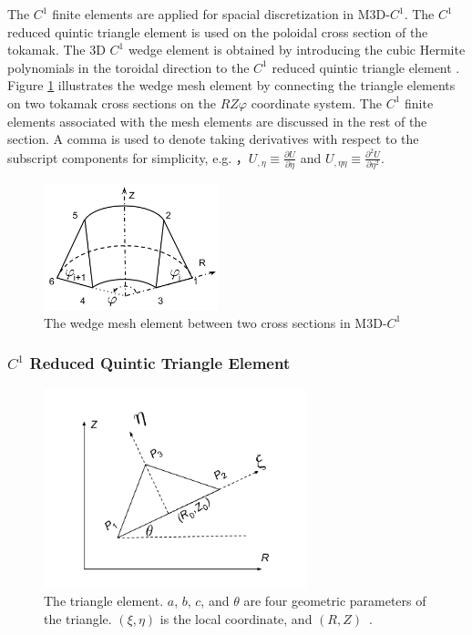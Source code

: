 \documentclass[11pt]{article}  %
\begin{document}
The $C^1$ finite elements are applied for spacial discretization in M3D-$C^1$. The $C^1$ reduced quintic triangle element \cite{jardin2004triangular} is used on the poloidal cross section of  the tokamak. The 3D $C^1$ wedge element is obtained by  introducing  the cubic Hermite polynomials in the toroidal direction to the $C^1$ reduced quintic triangle element  \cite{jardin2012multiple}. Figure \ref{fig:wedgeCurved} illustrates the wedge mesh element by connecting the triangle elements on two tokamak cross sections on the $RZ\varphi$ coordinate system. The $C^1$ finite elements associated with the mesh elements are discussed in the rest of the section. A comma is used to denote taking derivatives with respect to the subscript components for simplicity, e.g. ，$U_{,\eta} \equiv \frac{\partial U } {\partial \eta}$ and $U_{,\eta\eta} \equiv \frac{\partial^2 U}{ \partial \eta^2}$.

\begin{figure} 
\centering
\includegraphics[width=2in]{fig/wedgeCurved.png}
\caption{\small{The wedge mesh element between two cross sections in M3D-$C^1$}}
\label{fig:wedgeCurved}
\end{figure} 

\subsubsection{$C^1$ Reduced Quintic Triangle Element}
\begin{figure} 
\centering
\includegraphics[width=3in]{fig/coordinate.png}
\caption{\small{The triangle element. $a$, $b$, $c$, and $\theta$ are four geometric parameters of the triangle.  $(\xi,\eta)$ is the local  coordinate, and $(R,Z)$~\cite{jardin2004triangular}.}}
\label{fig:coordinate}
\end{figure} 
\end{document}
